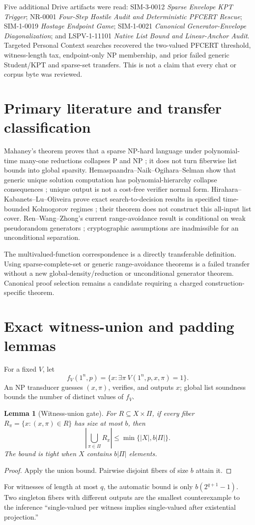 \documentclass[11pt]{article}
\newtheorem{lemma}{Lemma}
\begin{document}
Five additional Drive artifacts were read: SIM-3-0012 \emph{Sparse
Envelope KPT Trigger}; NR-0001 \emph{Four-Step Hostile Audit and
Deterministic PFCERT Rescue}; SIM-1-0019 \emph{Hostage Endpoint Game};
SIM-1-0021 \emph{Canonical Generator-Envelope Diagonalization}; and
LSPV-1-11101 \emph{Native List Bound and Linear-Anchor Audit}.  Targeted
Personal Context searches recovered the two-valued PFCERT threshold,
witness-length tax, endpoint-only NP membership, and prior failed generic
Student/KPT and sparse-set transfers.  This is not a claim that every
chat or corpus byte was reviewed.

\section{Primary literature and transfer classification}
Mahaney's theorem proves that a sparse NP-hard language under
polynomial-time many-one reductions collapses P and NP
\cite{mahaney1982}; it does not turn fiberwise list bounds into global
sparsity.  Hemaspaandra--Naik--Ogihara--Selman show that generic unique
solution computation has polynomial-hierarchy collapse consequences
\cite{hnos1996}; unique output is not a cost-free verifier normal form.
Hirahara--Kabanets--Lu--Oliveira prove exact search-to-decision results in
specified time-bounded Kolmogorov regimes \cite{hklo2024}; their theorem
does not construct this all-input list cover.  Ren--Wang--Zhong's current
range-avoidance result is conditional on weak pseudorandom generators
\cite{rwz2026}; cryptographic assumptions are inadmissible for an
unconditional separation.

The multivalued-function correspondence is a directly transferable
definition.  Using sparse-complete-set or generic range-avoidance
theorems is a failed transfer without a new global-density/reduction or
unconditional generator theorem.  Canonical proof selection remains a
candidate requiring a charged construction-specific theorem.

\section{Exact witness-union and padding lemmas}
For a fixed $V$, let
\[
 f_V(1^n,p)=\{x:\exists\pi\ V(1^n,p,x,\pi)=1\}.
\]
An NP transducer guesses $(x,\pi)$, verifies, and outputs $x$; global
list soundness bounds the number of distinct values of $f_V$.

\begin{lemma}[Witness-union gate]
For $R\subseteq X\times\Pi$, if every fiber
$R_\pi=\{x:(x,\pi)\in R\}$ has size at most $b$, then
\[
 \left|\bigcup_{\pi\in\Pi}R_\pi\right|
 \le\min\{|X|,b|\Pi|\}.
\]
The bound is tight when $X$ contains $b|\Pi|$ elements.
\end{lemma}
\begin{proof}
Apply the union bound.  Pairwise disjoint fibers of size $b$ attain it.
\end{proof}
For witnesses of length at most $q$, the automatic bound is only
$b(2^{q+1}-1)$.  Two singleton fibers with different outputs are the
smallest counterexample to the inference ``single-valued per witness
implies single-valued after existential projection.''
\end{document}

